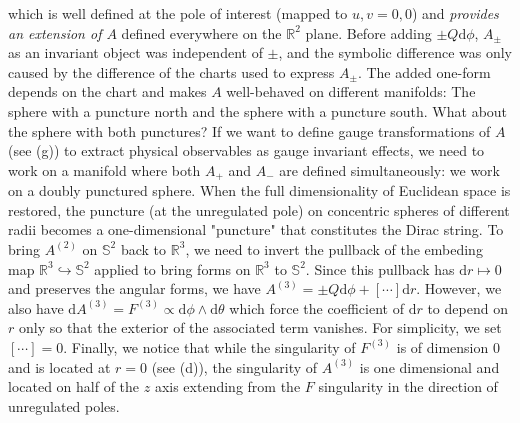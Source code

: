 \documentclass[10pt, a4paper]{article}
\begin{document}
{\begin{enumerate}
  which is well defined at the pole of interest (mapped to $u, v = 0, 0$) and \textit{provides an extension of $A$} defined everywhere on the $\mathbb{R}^2$ plane. Before adding $\pm Q\text{d}\phi$, $A_{\pm}$ as an invariant object was independent of $\pm$, and the symbolic difference was only caused by the difference of the charts used to express $A_\pm$. The added one-form depends on the chart and makes $A$ well-behaved on different manifolds: The sphere with a puncture north and the sphere with a puncture south. What about the sphere with both punctures? If we want to define gauge transformations of $A$ (see (g)) to extract physical observables as gauge invariant effects, we need to work on a manifold where both $A_+$ and $A_-$ are defined simultaneously: we work on a doubly punctured sphere. When the full dimensionality of Euclidean space is restored, the puncture (at the unregulated pole) on concentric spheres of different radii becomes a one-dimensional "puncture" that constitutes the Dirac string. To bring $A^{(2)}$ on $\mathbb{S}^2$ back to $\mathbb{R}^3$, we need  to invert the pullback of the embeding map $\mathbb{R}^3 \hookrightarrow \mathbb{S}^2$ applied to bring forms on $\mathbb{R}^3$ to $\mathbb{S}^2$. Since this pullback has $\text{d}r \mapsto 0$ and preserves the angular forms, we have $A^{(3)} = \pm Q\text{d}\phi + [\cdots]\text{d}r$. However, we also have $\text{d}A^{(3)} = F^{(3)} \propto \text{d}\phi \wedge \text{d}\theta$ which force the coefficient of $\text{d}r$ to depend on $r$ only so that the exterior of the associated term vanishes. For simplicity, we set $[\cdots] = 0$. Finally, we notice that while the singularity of $F^{(3)}$ is of dimension $0$ and is located at $r=0$ (see (d)), the singularity of $A^{(3)}$ is one dimensional and located on half of the $z$ axis extending from the $F$ singularity in the direction of unregulated poles. 
  

\end{enumerate}}
\end{document}
